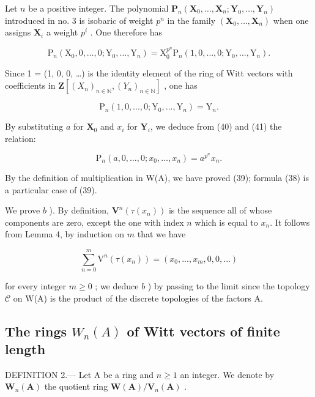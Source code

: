 Let \(n\) be a positive integer. The polynomial \(\mathbf{P}_{n}(\mathbf{X}_{0},\ldots,\mathbf{X}_{n};\mathbf{Y}_{0},\ldots,\mathbf{Y}_{n})\) introduced in no. 3 is isobaric of weight \(p^{n}\) in the family \((\mathbf{X}_{0},\ldots,\mathbf{X}_{n})\) when one assigns \(\mathbf{X}_{i}\) a weight \(p^{i}\) . One therefore has

\[
\mathrm{P} _ {n} \left(\mathrm{X} _ {0}, 0, \dots , 0; \mathrm{Y} _ {0}, \dots , \mathrm{Y} _ {n}\right) = \mathrm{X} _ {0} ^ {p ^ {n}} \mathrm{P} _ {n} (1, 0, \dots , 0; \mathrm{Y} _ {0}, \dots , \mathrm{Y} _ {n}).\tag{40}
\]

Since 1 = (1, 0, 0, \ldots) is the identity element of the ring of Witt vectors with coefficients in \(\mathbf{Z}[(X_n)_{n\in\mathbb{N}}, (Y_n)_{n\in\mathbb{N}}]\) , one has

\[
\mathrm{P} _ {n} (1, 0,..., 0; \mathrm{Y} _ {0},..., \mathrm{Y} _ {n}) = \mathrm{Y} _ {n}.\tag{41}
\]

By substituting \(a\) for \(\mathbf{X}_{0}\) and \(x_{i}\) for \(\mathbf{Y}_{i}\), we deduce from (40) and (41) the relation:

\[
\mathrm{P} _ {n} (a, 0, \dots , 0; x _ {0}, \dots , x _ {n}) = a ^ {p ^ {n}} x _ {n}.
\]

By the definition of multiplication in W(A), we have proved (39); formula (38) is a particular case of (39).

We prove \(b\) ). By definition, \(\mathbf{V}^{n}(\tau(x_{n}))\) is the sequence all of whose components are zero, except the one with index \(n\) which is equal to \(x_{n}\). It follows from Lemma 4, by induction on \(m\) that we have

\[
\sum_ {n = 0} ^ {m} \mathrm{V} ^ {n} (\tau (x _ {n})) = (x _ {0},..., x _ {m}, 0, 0,...)
\]

for every integer \(m \geqslant 0\) ; we deduce \(b\) ) by passing to the limit since the topology \(\mathcal{C}\) on W(A) is the product of the discrete topologies of the factors A.

\subsection{\texorpdfstring{The rings \(W_{n}(A)\) of Witt vectors of finite length}{The rings W\_\{n\}(A) of Witt vectors of finite length}}

DEFINITION 2.--- Let A be a ring and \(n \geqslant 1\) an integer. We denote by \(\mathbf{W}_{n}(\mathbf{A})\) the quotient ring \(\mathbf{W}(\mathbf{A}) / \mathbf{V}_{n}(\mathbf{A})\) .

